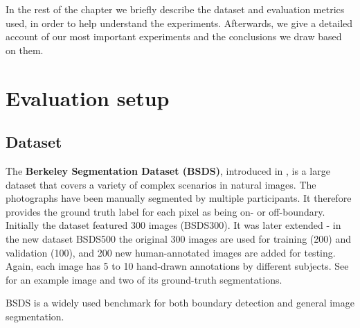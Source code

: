 In the rest of the chapter we briefly describe the dataset and evaluation metrics used, in order to help understand the experiments. Afterwards, we give a detailed account of our most important experiments and the conclusions we draw based on them.

\section{Evaluation setup} %
\subsection{Dataset}
\label{sec:ch5-BSDS500-dataset}
The {\bf Berkeley Segmentation Dataset (BSDS)}, introduced in \cite{Martin01}, is a large dataset that covers a variety of complex scenarios in natural images. The photographs have been manually segmented by multiple participants. It therefore provides the ground truth label for each pixel as being on- or off-boundary. Initially the dataset featured 300 images (BSDS300). It was later extended - in the new dataset BSDS500 \cite{Arbelaez11} the original 300 images are used for training (200) and validation (100), and 200 new human-annotated images are added for testing. Again, each image has 5 to 10 hand-drawn annotations by different subjects. See  for an example image and two of its ground-truth segmentations. %

BSDS is a widely used benchmark for both boundary detection and general image segmentation.

